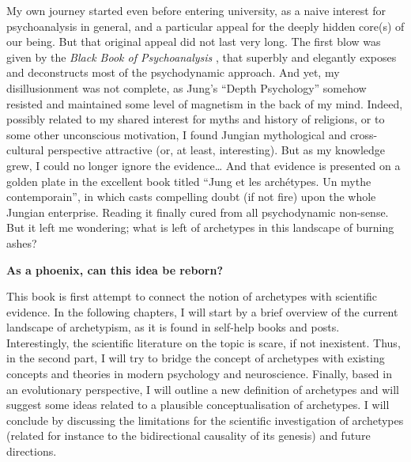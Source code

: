 \documentclass[
]{book}
\begin{document}
My own journey started even before entering university, as a naive interest for psychoanalysis in general, and a particular appeal for the deeply hidden core(s) of our being. But that original appeal did not last very long. The first blow was given by the \emph{Black Book of Psychoanalysis} \citep[``Le livre noir de la psychanalyse'';][]{borch2005livre}, that superbly and elegantly exposes and deconstructs most of the psychodynamic approach. And yet, my disillusionment was not complete, as Jung's ``Depth Psychology'' somehow resisted and maintained some level of magnetism in the back of my mind. Indeed, possibly related to my shared interest for myths and history of religions, or to some other unconscious motivation, I found Jungian mythological and cross-cultural perspective attractive (or, at least, interesting). But as my knowledge grew, I could no longer ignore the evidence\ldots{} And that evidence is presented on a golden plate in the excellent book titled ``Jung et les archétypes. Un mythe contemporain'', in which \citet{lequellec2013jung} casts compelling doubt (if not fire) upon the whole Jungian enterprise. Reading it finally cured from all psychodynamic non-sense. But it left me wondering; what is left of archetypes in this landscape of burning ashes?

\textbf{As a phoenix, can this idea be reborn?}

This book is first attempt to connect the notion of archetypes with scientific evidence. In the following chapters, I will start by a brief overview of the current landscape of archetypism, as it is found in self-help books and posts. Interestingly, the scientific literature on the topic is scare, if not inexistent. Thus, in the second part, I will try to bridge the concept of archetypes with existing concepts and theories in modern psychology and neuroscience. Finally, based in an evolutionary perspective, I will outline a new definition of archetypes and will suggest some ideas related to a plausible conceptualisation of archetypes. I will conclude by discussing the limitations for the scientific investigation of archetypes (related for instance to the bidirectional causality of its genesis) and future directions.
\end{document}
